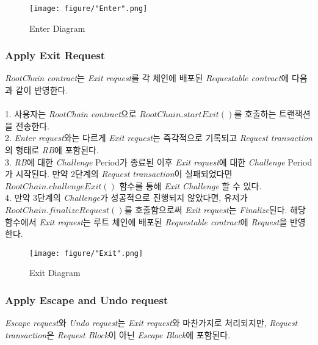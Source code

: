 \documentclass[letterpaper, 11pt]{article}
\begin{document}
\begin{CJK}{UTF8}{mj}
\begin{CJK}{UTF8}{mj}
\begin{figure}[H]
\centering
\texttt{[image: figure/"Enter".png]}
\caption{Enter Diagram}
\label{fig:enter-diagram}
\end{figure}

\end{CJK}

\subsubsection{Apply Exit Request}
\begin{CJK}{UTF8}{mj}
\emph{RootChain contract}는 \emph{Exit request}를 각 체인에 배포된 \emph{Requestable contract}에 다음과 같이 반영한다. \\
\\
1. 사용자는 \emph{RootChain contract}으로 $RootChain.startExit()$를 호출하는 트랜잭션을 전송한다.\\
2. \emph{Enter request}와는 다르게 \emph{Exit request}는 즉각적으로 기록되고 \emph{Request transaction}의 형태로 \emph{RB}에 포함된다. \\
3. \emph{RB}에 대한 \emph{Challenge} Period가 종료된 이후 \emph{Exit request}에 대한 \emph{Challenge} Period가 시작된다. 만약 2단계의 \emph{Request transaction}이 실패되었다면 $RootChain.challengeExit()$ 함수를 통해 \emph{Exit Challenge} 할 수 있다. \\
4. 만약 3단계의 \emph{Challenge}가 성공적으로 진행되지 않았다면, 유저가 $RootChain.finalizeRequest()$를 호출함으로써 \emph{Exit request}는 \emph{Finalize}된다. 해당 함수에서 \emph{Exit request}는 루트 체인에 배포된 \emph{Requestable contract}에 \emph{Request}을 반영한다.

\begin{figure}[H]
\centering
\texttt{[image: figure/"Exit".png]}
\caption{Exit Diagram}
\label{fig:exit-diagram}
\end{figure}

\end{CJK}

\subsubsection{Apply Escape and Undo request}
\begin{CJK}{UTF8}{mj}
\emph{Escape request}와 \emph{Undo request}는 \emph{Exit request}와 마찬가지로 처리되지만, \emph{Request transaction}은 \emph{Request Block}이 아닌 \emph{Escape Block}에 포함된다.
\end{CJK}

\end{CJK}
\end{document}
